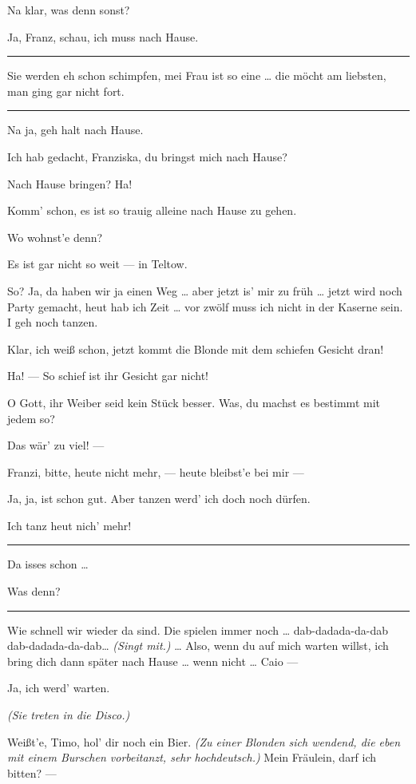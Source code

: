 \documentclass[
	final,
	a4paper,
	ngerman,
	mpinclude = true, %
	twoside = true,
	open = right,
	cleardoublepage = plain,
	DIV = 13,
	BCOR = 1cm,
	titlepage = firstiscover,
	]{scrbook}
\newcommand{\direction}[1]{\textit{(#1)}}
\newenvironment{deletion}{%
		\vspace{0.25\baselineskip}
		\hrule
		\vspace{0.25\baselineskip}
		\color{darkgray}
	}{
		\color{black}
		\vspace{0.25\baselineskip}
		\hrule 
		\vspace{0.25\baselineskip}
	}
\newcommand{\thecharacter}[1]{\textup{\textsc{#1}}\xspace}
\newcommand{\thesoldatin}{\thecharacter{Franziska}}
\newcommand{\thepraktikant}{\thecharacter{Timo}}
\newcommand{\character}[1]{\item[#1:]}
\newcommand{\soldatin}{\character{\thesoldatin}}
\newcommand{\praktikant}{\character{\thepraktikant}}
\begin{document}
\begin{play}
	\soldatin
	Na klar, was denn sonst?

	\praktikant
	Ja, Franz, schau, ich muss nach Hause.
	\begin{deletion}
		Sie werden eh schon schimpfen, mei Frau ist so eine \ldots{} die möcht am liebsten, man ging gar nicht fort.
	\end{deletion}

	\soldatin
	Na ja, geh halt nach Hause.

	\praktikant
	Ich hab  gedacht, Franziska, du bringst mich nach Hause?

	\soldatin
	Nach Hause bringen? Ha!

	\praktikant
	Komm' schon, es ist so trauig alleine nach Hause zu gehen.

	\soldatin
	Wo wohnst'e denn?

	\praktikant
	Es ist gar nicht so weit --- in Teltow.

	\soldatin
	So? Ja, da haben wir ja einen Weg \ldots{} aber jetzt is' mir zu früh \ldots{} jetzt wird noch Party gemacht, heut hab ich Zeit \ldots{} vor zwölf muss ich nicht in der Kaserne sein. I geh noch tanzen.

	\praktikant
	Klar, ich weiß schon, jetzt kommt die Blonde mit dem schiefen Gesicht dran!

	\soldatin
	Ha! --- So schief ist ihr Gesicht gar nicht!

	\praktikant
	O Gott, ihr Weiber seid kein Stück besser. Was, du machst es bestimmt mit jedem so?

	\soldatin
	Das wär' zu viel! ---

	\praktikant
	Franzi, bitte, heute nicht mehr, --- heute bleibst'e bei mir ---

	\soldatin
	Ja, ja, ist schon gut. Aber tanzen werd' ich doch noch dürfen.

	\praktikant
	Ich tanz heut nich' mehr!

	\begin{deletion}
	\soldatin
	Da isses schon \ldots{}

	\praktikant
	Was denn?
	\end{deletion}

	\soldatin
	Wie schnell wir wieder da sind. Die spielen immer noch \ldots{} dab-dadada-da-dab dab-dadada-da-dab\ldots{} \direction{Singt mit.} \ldots{} Also, wenn du auf mich warten willst, ich bring dich dann später nach Hause \ldots{} wenn nicht \ldots{} Caio ---

	\praktikant
	Ja, ich werd' warten.

	\direction{Sie treten in die Disco.}

	\soldatin
	Weißt'e, Timo, hol' dir noch ein Bier. \direction{Zu einer Blonden sich wendend, die eben mit einem Burschen vorbeitanzt, sehr hochdeutsch.} Mein Fräulein, darf ich bitten? ---
\end{play}
\end{document}

